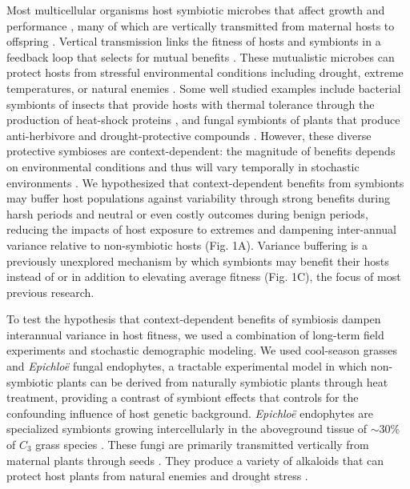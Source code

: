 \documentclass[lineno, sn-basic]{sn-jnl}%
\begin{document}
Most multicellular organisms host symbiotic microbes that affect growth and performance \citep{rodriguez2009fungal,mcfall2013animals}, many of which are vertically transmitted from maternal hosts to offspring \citep{funkhouser2013mom}.
Vertical transmission links the fitness of hosts and symbionts in a feedback loop that selects for mutual benefits \citep{fine1975vectors}.
These mutualistic microbes can protect hosts from stressful environmental conditions including drought, extreme temperatures, or natural enemies \citep{russell2006costs, kivlin2013fungal}. 
Some well studied examples include bacterial symbionts of insects that provide hosts with thermal tolerance through the production of heat-shock proteins \citep{dunbar2007aphid}, and fungal symbionts of plants that produce anti-herbivore and drought-protective compounds \citep{reyna2012detection,saikkonen2013chemical,neyaz2022localization}.
However, these diverse protective symbioses are context-dependent: the magnitude of benefits depends on environmental conditions \citep{chamberlain2014context,catford2022addressing} and thus will vary temporally in stochastic environments \citep{jordano1994spatial}. 
We hypothesized that context-dependent benefits from symbionts may buffer host populations against variability through strong benefits during harsh periods and neutral or even costly outcomes during benign periods, reducing the impacts of host exposure to extremes and dampening inter-annual variance relative to non-symbiotic hosts (Fig. 1A).
Variance buffering is a previously unexplored mechanism by which symbionts may benefit their hosts instead of or in addition to elevating average fitness (Fig. 1C), the focus of most previous research. 

To test the hypothesis that context-dependent benefits of symbiosis dampen interannual variance in host fitness, we used a combination of long-term field experiments and stochastic demographic modeling.
We used cool-season grasses and \emph{Epichlo\"{e}} fungal endophytes, a tractable experimental model in which non-symbiotic plants can be derived from naturally symbiotic plants through heat treatment, providing a contrast of symbiont effects that controls for the confounding influence of host genetic background. 
\emph{Epichlo\"{e}} endophytes are specialized symbionts growing intercellularly in the aboveground tissue of  $\sim30$\% of $C_{3}$ grass species \citep{leuchtmann1992systematics}.
These fungi are primarily transmitted vertically from maternal plants through seeds \citep{cheplick2009ecology}.
They produce a variety of alkaloids that can protect host plants from natural enemies \citep{brem2001epichloe} and drought stress \citep{decunta2021systematic}.
\end{document}
